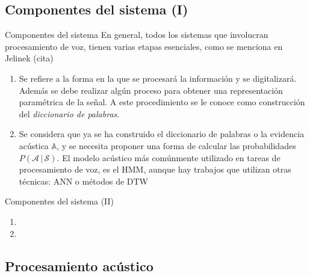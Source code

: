 \subsection{Componentes del sistema (I)}
\begin{frame}{Componentes del sistema}
  En general, todos los sistemas que involucran procesamiento de
  voz, tienen varias etapas esenciales, como se menciona en Jelinek (cita)

  \begin{enumerate}
    \itemsep1em
    \item {}
    Se refiere a la forma en la que se procesará la información y se digitalizará.%
    Además se debe realizar algún proceso para obtener una representación paramétrica de la señal. A este procedimiento se le conoce como construcción del \textit{diccionario de palabras}.

    \item {}
    Se considera que ya se ha construido el diccionario de palabras o la evidencia acústica $\mathbb{A}$, y se necesita proponer una forma de calcular las probabilidades $P(\mathcal{A} \,|\, \mathcal{S})$. 
    El modelo acústico más comúnmente utilizado en tareas de procesamiento de voz, es el HMM, aunque hay trabajos que utilizan otras técnicas: ANN \cite{Jothilakshmi2009} \cite{Gutzwiller2010}  o métodos de DTW \cite{Huijbregts2011} 
  \end{enumerate}

\end{frame}

\begin{frame}{Componentes del sistema (II)}
  \begin{enumerate}
    \item {}
    \item {}
  \end{enumerate}

\end{frame}

\subsection{Procesamiento acústico}

